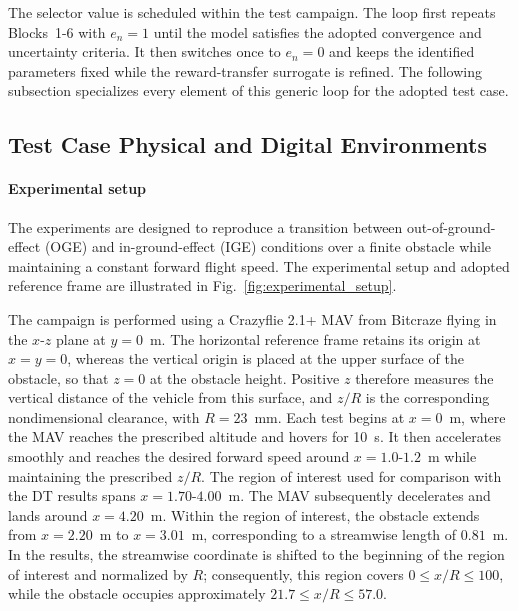 \documentclass[journal]{IEEEtran}
\begin{document}
The selector value is scheduled within the test campaign. The loop first repeats Blocks~1-6 with $e_n=1$ until the model satisfies the adopted convergence and uncertainty criteria. It then switches once to $e_n=0$ and keeps the identified parameters fixed while the reward-transfer surrogate is refined. The following subsection specializes every element of this generic loop for the adopted test case.
\subsection{Test Case Physical and Digital Environments}
\label{sec:setup}
\paragraph*{Experimental setup}
The experiments are designed to reproduce a transition between out-of-ground-effect (OGE) and in-ground-effect (IGE) conditions over a finite obstacle while maintaining a constant forward flight speed. The experimental setup and adopted reference frame are illustrated in Fig.~\ref{fig:experimental_setup}.

The campaign is performed using a Crazyflie 2.1+ MAV from Bitcraze flying in the $x$-$z$ plane at $y=0$~m. The horizontal reference frame retains its origin at $x=y=0$, whereas the vertical origin is placed at the upper surface of the obstacle, so that $z=0$ at the obstacle height. Positive $z$ therefore measures the vertical distance of the vehicle from this surface, and $z/R$ is the corresponding nondimensional clearance, with $R=23$~mm. Each test begins at $x=0$~m, where the MAV reaches the prescribed altitude and hovers for 10~s. It then accelerates smoothly and reaches the desired forward speed around $x=1.0$-$1.2$~m while maintaining the prescribed $z/R$. The region of interest used for comparison with the DT results spans $x=1.70$-$4.00$~m. The MAV subsequently decelerates and lands around $x=4.20$~m. Within the region of interest, the obstacle extends from $x=2.20$~m to $x=3.01$~m, corresponding to a streamwise length of $0.81$~m. In the results, the streamwise coordinate is shifted to the beginning of the region of interest and normalized by $R$; consequently, this region covers $0\leq x/R\leq100$, while the obstacle occupies approximately $21.7\leq x/R\leq57.0$.
\end{document}
